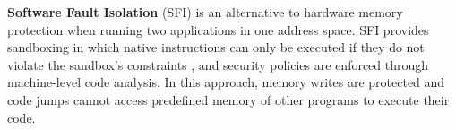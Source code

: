 \textbf{Software Fault Isolation} (SFI) is an alternative to hardware memory
protection when running two applications in one address space. SFI provides sandboxing in which native
instructions can only be executed if they do not violate the sandbox's
constraints \cite{SFI:93}, and security policies are enforced through machine-level
code analysis. In this approach, memory
writes are protected and code jumps cannot access predefined memory of
other programs to execute their code.

%
%

